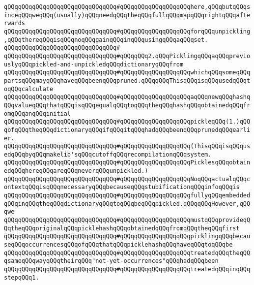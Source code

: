\verb|qQQqqQQqqQQqqQQqqQQqqQQqqQQqqQQq#qQQqqQQqqQQqqQQqqQQqhere,qQQqbutqQQqsinceqQQqweqQQq(usually)qQQqneedqQQqtheqQQqfullqQQqmapqQQqrightqQQqafterwards|\newline
\verb|qQQqqQQqqQQqqQQqqQQqqQQqqQQqqQQq#qQQqqQQqqQQqqQQqqQQqforqQQqunpickling,qQQqthereqQQqisqQQqnoqQQqgainqQQqinqQQqusingqQQqaqQQqset.|\newline
\verb|qQQqqQQqqQQqqQQqqQQqqQQqqQQqqQQq#|\newline
\verb|qQQqqQQqqQQqqQQqqQQqqQQqqQQqqQQq#qQQqqQQq2.qQQqPicklingqQQqaqQQqpreviouslyqQQqpickled-and-unpickledqQQqdictionaryqQQqfrom|\newline
\verb|qQQqqQQqqQQqqQQqqQQqqQQqqQQqqQQq#qQQqqQQqqQQqqQQqqQQqwhichqQQqsomeqQQqpartsqQQqmayqQQqhaveqQQqbeenqQQqpruned.qQQqqQQqThisqQQqisqQQqusedqQQqtoqQQqcalculate|\newline
\verb|qQQqqQQqqQQqqQQqqQQqqQQqqQQqqQQq#qQQqqQQqqQQqqQQqqQQqaqQQqnewqQQqhashqQQqvalueqQQqthatqQQqisqQQqequalqQQqtoqQQqtheqQQqhashqQQqobtainedqQQqfromqQQqanqQQqinitial|\newline
\verb|qQQqqQQqqQQqqQQqqQQqqQQqqQQqqQQq#qQQqqQQqqQQqqQQqqQQqpickleqQQq(1.)qQQqofqQQqtheqQQqdictionaryqQQqifqQQqitqQQqhadqQQqbeenqQQqprunedqQQqearlier.|\newline
\verb|qQQqqQQqqQQqqQQqqQQqqQQqqQQqqQQq#qQQqqQQqqQQqqQQqqQQq(ThisqQQqisqQQqusedqQQqbyqQQqmakelib'sqQQqcutoffqQQqrecompilationqQQqsystem.|\newline
\verb|qQQqqQQqqQQqqQQqqQQqqQQqqQQqqQQq#qQQqqQQqqQQqqQQqqQQqPicklesqQQqobtainedqQQqhereqQQqareqQQqneverqQQqunpickled.)|\newline
\verb|qQQqqQQqqQQqqQQqqQQqqQQqqQQqqQQq#qQQqqQQqqQQqqQQqqQQqNoqQQqactualqQQqcontextqQQqisqQQqnecessaryqQQqbecauseqQQqstubificationqQQqinfoqQQqis|\newline
\verb|qQQqqQQqqQQqqQQqqQQqqQQqqQQqqQQq#qQQqqQQqqQQqqQQqqQQqfullyqQQqembeddedqQQqinqQQqtheqQQqdictionaryqQQqtoqQQqbeqQQqpickled.qQQqqQQqHowever,qQQqwe|\newline
\verb|qQQqqQQqqQQqqQQqqQQqqQQqqQQqqQQq#qQQqqQQqqQQqqQQqqQQqmustqQQqprovideqQQqtheqQQqoriginalqQQqpicklehashqQQqobtainedqQQqfromqQQqtheqQQqfirst|\newline
\verb|qQQqqQQqqQQqqQQqqQQqqQQqqQQqqQQq#qQQqqQQqqQQqqQQqqQQqpicklingqQQqbecauseqQQqoccurrencesqQQqofqQQqthatqQQqpicklehashqQQqhaveqQQqtoqQQqbe|\newline
\verb|qQQqqQQqqQQqqQQqqQQqqQQqqQQqqQQq#qQQqqQQqqQQqqQQqqQQqtreatedqQQqtheqQQqsameqQQqwayqQQqtheirqQQq"not-yet-occurrences"qQQqhadqQQqbeen|\newline
\verb|qQQqqQQqqQQqqQQqqQQqqQQqqQQqqQQq#qQQqqQQqqQQqqQQqqQQqtreatedqQQqinqQQqstepqQQq1.|\newline
